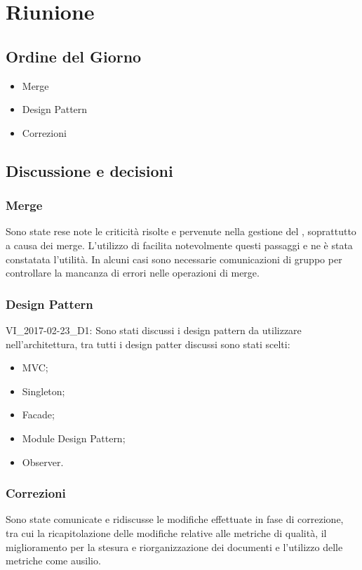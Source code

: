 \section{Riunione}
\subsection{Ordine del Giorno}
\begin{itemize}
	\item Merge
	\item Design Pattern
	\item Correzioni
\end{itemize}

\subsection{Discussione e decisioni}

\subsubsection{Merge}
Sono state rese note le criticità risolte e pervenute nella gestione del , soprattutto a causa dei merge. L'utilizzo di  facilita notevolmente questi passaggi e ne è stata constatata l'utilità. In alcuni casi sono necessarie comunicazioni di gruppo per controllare la mancanza di errori nelle operazioni di merge.

\subsubsection{Design Pattern}
VI\_2017-02-23\_D1: Sono stati discussi i design pattern da utilizzare nell'architettura, tra tutti i design patter discussi sono stati scelti:
\begin{itemize}
	\item MVC;
	\item Singleton;
	\item Facade;
	\item Module Design Pattern;
	\item Observer.
\end{itemize}

\subsubsection{Correzioni}
Sono state comunicate e ridiscusse le modifiche effettuate in fase di correzione, tra cui la ricapitolazione delle modifiche relative alle metriche di qualità, il miglioramento per la stesura e riorganizzazione dei documenti e l'utilizzo delle metriche come ausilio.


\clearpage
